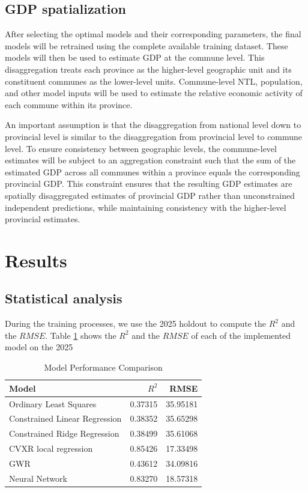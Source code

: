 \documentclass[11pt]{article} %
\begin{document}
\subsection{GDP spatialization}

After selecting the optimal models and their corresponding parameters, the final models will be retrained using the complete available training dataset. These models will then be used to estimate GDP at the commune level. This disaggregation treats each province as the higher-level geographic unit and its constituent communes as the lower-level units. Commune-level NTL, population, and other model inputs will be used to estimate the relative economic activity of each commune within its province.

An important assumption is that the disaggregation from national level down to provincial level is similar to the disaggregation from provincial level to commune level. To ensure consistency between geographic levels, the commune-level estimates will be subject to an aggregation constraint such that the sum of the estimated GDP across all communes within a province equals the corresponding provincial GDP. This constraint ensures that the resulting GDP estimates are spatially disaggregated estimates of provincial GDP rather than unconstrained independent predictions, while maintaining consistency with the higher-level provincial estimates.

\section{Results}
\subsection{Statistical analysis}
During the training processes, we use the 2025 holdout to compute the $R^2$ and the $RMSE$. Table \ref{tab:model_comparison} shows the $R^2$ and the $RMSE$ of each of the implemented model on the 2025 

\begin{table}[htbp]
    \centering
    \caption{Model Performance Comparison}
    \label{tab:model_comparison}
    \begin{tabular}{lrr}
        \hline
        Model & $R^2$ & RMSE \\
        \hline
        Ordinary Least Squares & 0.37315 & 35.95181 \\
        Constrained Linear Regression & 0.38352 & 35.65298 \\
        Constrained Ridge Regression & 0.38499 & 35.61068 \\
        CVXR local regression & 0.85426 & 17.33498 \\
        GWR & 0.43612 & 34.09816 \\
        Neural Network & 0.83270 & 18.57318 \\
        \hline
    \end{tabular}
\end{table}
\end{document}
